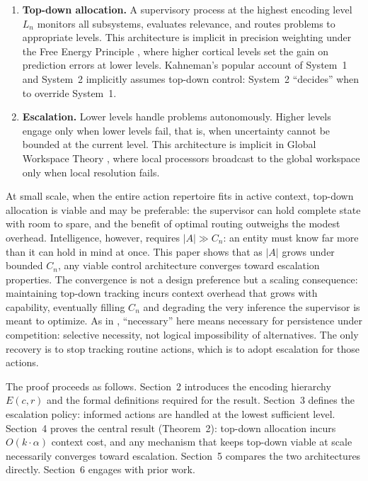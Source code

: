 \documentclass[11pt]{article}
\theoremstyle{definition}
\begin{document}
\begin{enumerate}
\item \textbf{Top-down allocation.} A supervisory process at the
   highest encoding level $L_n$ monitors all subsystems, evaluates
   relevance, and routes problems to appropriate levels. This
   architecture is implicit in precision weighting under the Free
   Energy Principle \cite{Friston2010,Friston2017}, where higher
   cortical levels set the gain on prediction errors at lower levels.
   Kahneman's popular
   account of System~1 and System~2 \cite{Kahneman2011} implicitly
   assumes top-down control: System~2 ``decides'' when to override
   System~1.

\item \textbf{Escalation.} Lower levels handle problems autonomously.
   Higher levels engage only when lower levels fail, that is, when
   uncertainty cannot be bounded at the current level. This
   architecture is implicit in Global Workspace Theory
   \cite{Baars1988,Dehaene2011}, where local processors broadcast to
   the global workspace only when local resolution fails.
\end{enumerate}

At small scale, when the entire action repertoire fits in active
context, top-down allocation is viable and may be preferable: the
supervisor can hold complete state with room to spare, and the benefit
of optimal routing outweighs the modest overhead. Intelligence,
however, requires $|A| \gg C_n$: an entity must know far more than it
can hold in mind at once. This paper shows that as $|A|$ grows under
bounded $C_n$, any viable control architecture converges toward
escalation properties. The convergence is not a design preference but
a scaling consequence: maintaining top-down tracking incurs context
overhead that grows with capability, eventually filling $C_n$ and
degrading the very inference the supervisor is meant to optimize.
As in \cite{McCarthy2026a}, ``necessary'' here means necessary for
persistence under competition: selective necessity, not logical
impossibility of alternatives. The
only recovery is to stop tracking routine actions, which is to adopt
escalation for those actions.

The proof proceeds as follows. Section~2 introduces the encoding
hierarchy $E(c,r)$ and the formal definitions required for the result.
Section~3 defines the escalation policy: informed
actions are handled at the lowest sufficient level. Section~4 proves
the central result (Theorem~2): top-down allocation incurs $O(k
\cdot \alpha)$ context cost, and any mechanism that keeps top-down
viable at scale necessarily converges toward escalation. Section~5
compares the two architectures directly. Section~6 engages with prior
work.
\end{document}
